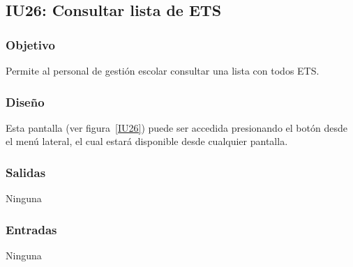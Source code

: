 
\subsection{IU26: Consultar lista de ETS}
\subsubsection{Objetivo}
    Permite al personal de gestión escolar consultar una lista con todos ETS.
\subsubsection{Diseño}
    Esta pantalla  (ver figura~\ref{IU26}) puede ser accedida presionando el botón  desde el menú lateral, el cual estará disponible desde cualquier pantalla.
     

\subsubsection{Salidas}
Ninguna
\subsubsection{Entradas}
Ninguna
